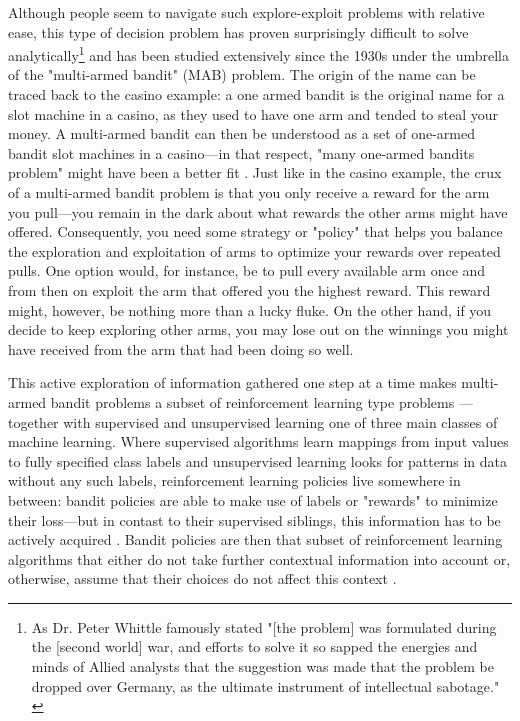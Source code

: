 \documentclass{jss}
\begin{document}
Although people seem to navigate such explore-exploit problems with relative ease, this type of decision problem has proven surprisingly difficult to solve analytically\footnote{As Dr. Peter Whittle famously stated "[the problem] was formulated during the [second world] war, and efforts to solve it so sapped the energies and minds of Allied analysts that the suggestion was made that the problem be dropped over Germany, as the ultimate instrument of intellectual sabotage." \citep{Whittle1979}} and has been studied extensively since the 1930s \citep{Robbins1952,Bubeck2012} under the umbrella of the "multi-armed bandit" (MAB) problem. The origin of the name can be traced back to the casino example: a one armed bandit is the original name for a slot machine in a casino, as they used to have one arm and tended to steal your money. A multi-armed bandit can then be understood as a set of one-armed bandit slot machines in a casino---in that respect, "many one-armed bandits problem" might have been a better fit \citep{2018a}. Just like in the casino example, the crux of a multi-armed bandit problem is that you only receive a reward for the arm you pull---you remain in the dark about what rewards the other arms might have offered. Consequently, you need some strategy or "policy" that helps you balance the exploration and exploitation of arms to optimize your rewards over repeated pulls. One option would, for instance, be to pull every available arm once and from then on exploit the arm that offered you the highest reward. This reward might, however, be nothing more than a lucky fluke. On the other hand, if you decide to keep exploring other arms, you may lose out on the winnings you might have received from the arm that had been doing so well.

This active exploration of information gathered one step at a time makes multi-armed bandit problems a subset of reinforcement learning type problems ---together with supervised and unsupervised learning one of three main classes of machine learning. Where supervised algorithms learn mappings from input values to fully specified class labels and unsupervised learning looks for patterns in data without any such labels, reinforcement learning policies live somewhere in between: bandit policies are able to make use of labels or "rewards" to minimize their loss---but in contast to their supervised siblings, this information has to be actively acquired \citep{Jordan2015}. Bandit policies are then that subset of reinforcement learning algorithms that either do not take further contextual information into account or, otherwise, assume that their choices do not affect this context \citep{steenwinckel2018self,Sutton1998e}.
\end{document}
